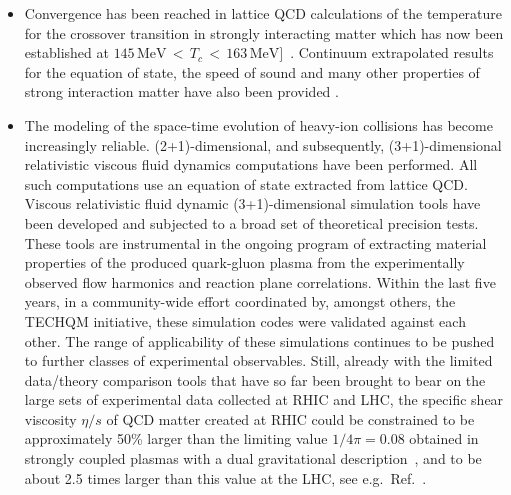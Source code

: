\begin{itemize}

\item
Convergence has been reached in lattice QCD calculations of the temperature for the crossover 
transition in strongly interacting matter which has now been established 
at $145\,\mathrm{MeV}{\,<\,}T_c{\,<\,}163\,\mathrm{MeV}]$~\cite{Aoki:2006br,Aoki:2009sc,Bazavov:2011nk,Bazavov:2014pvz}. Continuum extrapolated results for the equation of state, the speed of sound and many other properties 
of strong interaction matter have also been provided \cite{Borsanyi:2013bia,Bazavov:2014pvz}.

\item 
The modeling of the space-time evolution of heavy-ion collisions has become increasingly reliable. (2+1)-dimensional, and subsequently, (3+1)-dimensional relativistic viscous fluid dynamics computations have been performed. 
All such computations use an equation of state extracted from lattice QCD.
Viscous relativistic fluid dynamic (3+1)-dimensional
simulation tools have been developed and subjected to a broad set of 
theoretical precision tests. These tools are instrumental in the ongoing program of extracting 
material properties of the produced  
quark-gluon plasma
from the experimentally observed flow harmonics and reaction plane correlations. 
Within the last five years, in a community-wide effort coordinated by, amongst others,
the TECHQM\cite{TECHQM} initiative, these simulation codes were validated against each other. The range of
applicability of these simulations continues to be pushed to further classes of experimental observables.
Still, already with the limited data/theory comparison tools that have so far been brought to bear on the large sets of experimental data collected at RHIC and LHC, the specific shear viscosity $\eta/s$ of QCD matter created at RHIC could be constrained to be approximately 50\% larger than the limiting value $1/4\pi=0.08$ obtained in strongly coupled plasmas
with a dual gravitational description~\cite{Kovtun:2004de}, 
and to be about 2.5 times larger than this value at the LHC, see e.g.~Ref.~\cite{Gale:2012rq}. 


\end{itemize}

